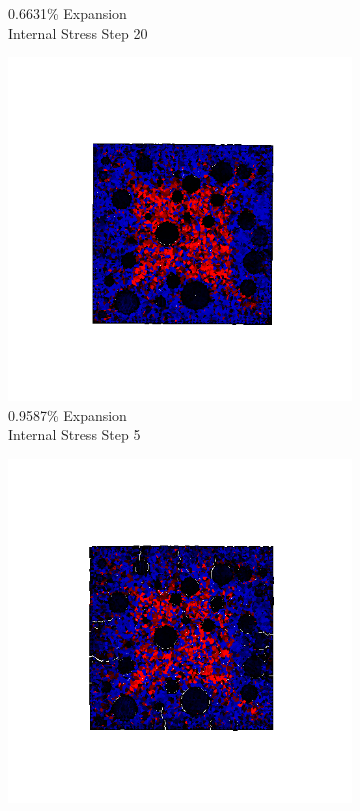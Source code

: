 \begin{figure}[ht!]
\begin{subfigure}{.25\textwidth}
      \caption{0.6631\% Expansion\\Internal Stress Step 20}
    \end{subfigure}

    \begin{subfigure}{.25\textwidth}
      \centering
      \includegraphics[width=1.0\linewidth]{Files/exp_3D/DEF/A15X0C_4_s5.png}
      \caption{0.9587\% Expansion\\Internal Stress Step 5}
    \end{subfigure}%
    \begin{subfigure}{.25\textwidth}
      \centering
      \includegraphics[width=1.0\linewidth]{Files/exp_3D/DEF/A15X0C_4_s10.png}

\end{subfigure}
\end{figure}
